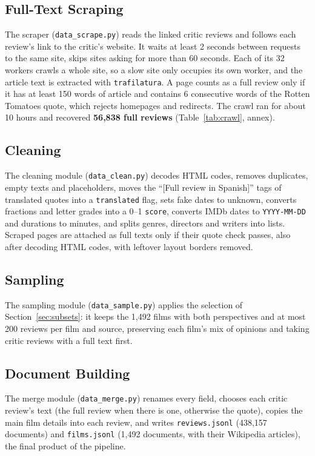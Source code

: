 \subsection{Full-Text Scraping}
\label{sec:scraping}
The scraper (\texttt{data_scrape.py}) reads the linked critic reviews and follows each review's link to the critic's website. It waits at least 2 seconds between requests to the same site, skips sites asking for more than 60 seconds. Each of its 32 workers crawls a whole site, so a slow site only occupies its own worker, and the article text is extracted with \texttt{trafilatura}. A page counts as a full review only if it has at least 150 words of article and contains 6 consecutive words of the Rotten Tomatoes quote, which rejects homepages and redirects. The crawl ran for about 10 hours and recovered \textbf{56,838 full reviews} (Table~\ref{tab:crawl}, annex).

\subsection{Cleaning}
The cleaning module (\texttt{data_clean.py}) decodes HTML codes, removes duplicates, empty texts and placeholders, moves the ``[Full review in Spanish]'' tags of translated quotes into a \texttt{translated} flag, sets fake dates to unknown, converts fractions and letter grades into a 0--1 \texttt{score}, converts IMDb dates to \texttt{YYYY-MM-DD} and durations to minutes, and splits genres, directors and writers into lists. Scraped pages are attached as full texts only if their quote check passes, also after decoding HTML codes, with leftover layout borders removed.

\subsection{Sampling}
The sampling module (\texttt{data_sample.py}) applies the selection of Section~\ref{sec:subsets}: it keeps the 1,492 films with both perspectives and at most 200 reviews per film and source, preserving each film's mix of opinions and taking critic reviews with a full text first.

\subsection{Document Building}
The merge module (\texttt{data_merge.py}) renames every field, chooses each critic review's text (the full review when there is one, otherwise the quote), copies the main film details into each review, and writes \texttt{reviews.jsonl} (438,157 documents) and \texttt{films.jsonl} (1,492 documents, with their Wikipedia articles), the final product of the pipeline.

